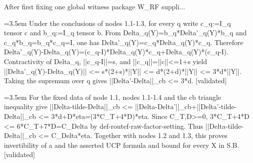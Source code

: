 \documentclass{article}
\newcommand{\step}[1]{\par\noindent\hangindent=3.5em\hangafter=1%
  \makebox[3.5em][l]{\textbf{#1.}}}
\newcommand{\steptag}[1]{\hfill{\small\textsf{[#1]}}}
\begin{document}
\begin{proofbox}{After first fixing one global witness package W\_RF suppli...}
\step{1.4} Under the conclusions of nodes 1.1-1.3, for every q write c\_q:=I\_q tensor c and b\_q:=I\_q tensor b. From Delta\_q(Y)=b\_q*Delta'\_q(Y)*b\_q and c\_q*b\_q=b\_q*c\_q=I, one has Delta'\_q(Y)=c\_q*Delta\_q(Y)*c\_q. Therefore Delta'\_q(Y)-Delta\_q(Y)=(c\_q-I)*Delta\_q(Y)*c\_q+Delta\_q(Y)*(c\_q-I). Contractivity of Delta\_q, ||c\_q-I||=s, and ||c\_q||=||c||<=1+s yield ||Delta'\_q(Y)-Delta\_q(Y)|| <= s*(2+s)*||Y|| <= d*(2+d)*||Y|| <= 3*d*||Y||. Taking the supremum over q gives ||Delta'-Delta||\_cb <= 3*d. \steptag{validated} \\[4pt]
\step{1.5} For the fixed data of node 1.1, nodes 1.1-1.4 and the cb triangle inequality give ||Delta-tilde-Delta||\_cb <= ||Delta-Delta'||\_cb+||Delta'-tilde-Delta||\_cb <= 3*d+D*eta=(3*C\_T+4*D)*eta. Since C\_T,D>=0, 3*C\_T+4*D <= 6*C\_T+7*D=C\_Delta by def-routef-raw-factor-setting. Thus ||Delta-tilde-Delta||\_cb <= C\_Delta*eta. Together with nodes 1.2 and 1.3, this proves invertibility of a and the asserted UCP formula and bound for every X in S.B. \steptag{validated} \\[4pt]
\end{proofbox}
\end{document}
